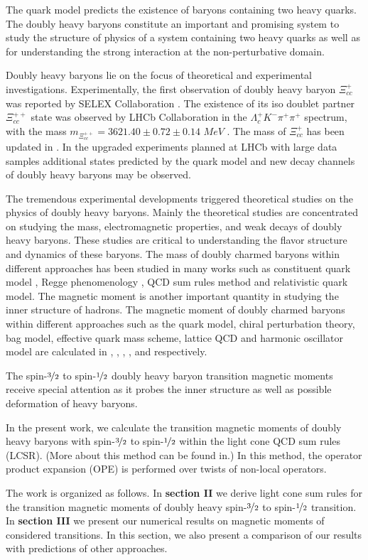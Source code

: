 \label{chp:intro}

The quark model predicts the existence of baryons containing two heavy quarks. The doubly heavy baryons constitute an important and promising system to study the structure of physics of a system containing two heavy quarks as well as for understanding the strong interaction at the non-perturbative domain.

Doubly heavy baryons lie on the focus of theoretical and experimental investigations. Experimentally, the first observation of doubly heavy baryon $\Xi_{cc}^+$ was reported by SELEX Collaboration \cite{xi+}.
The existence of its iso doublet partner $\Xi_{cc}^{++}$ state was observed by LHCb Collaboration in the $\Lambda_c^+K^-\pi^+\pi^+$ spectrum, with the mass $m_{\Xi_{cc}^{++}}=3621.40\pm0.72\pm0.14$ $MeV$ \cite{xi++}. The mass of $\Xi_{cc}^+$ has been updated in \cite{xi++,aaij2,aaij3,aaij4}. In the upgraded experiments planned at LHCb with large data samples additional states predicted by the quark model and new decay channels of doubly heavy baryons may be observed.

The tremendous experimental developments triggered theoretical studies on the physics of doubly heavy baryons. Mainly the theoretical studies are concentrated on studying the mass, electromagnetic properties, and weak decays of doubly heavy baryons. These studies are critical to understanding the flavor structure and dynamics of these baryons. The mass of doubly charmed baryons within different approaches has been studied in many works such as constituent quark model \cite{consQM1,consQM2,consQM3,consQM4,consQM5,consQM6,consQM8,consQM9}, Regge phenomenology \cite{regge1,regge2}, QCD sum rules method \cite{qcdsr1,qcdsr2,qcdsr3,qcdsr4,AlievOctet,AlievDecuplet} and relativistic quark model\cite{rqm1}. The magnetic moment is another important quantity in studying the inner structure of hadrons. The magnetic moment of doubly charmed baryons within different approaches such as the  quark model, chiral perturbation theory, bag model, effective quark mass scheme, lattice QCD and harmonic oscillator model are calculated in \cite{transition15}, \cite{transition10}, \cite{DhirEMS}, \cite{exBag}, \cite{lattice} and \cite{harmonic} respectively.

The spin-$\nicefrac{3}{2}$ to spin-$\nicefrac{1}{2}$ doubly heavy baryon transition magnetic moments receive special attention as it probes the inner structure as well as possible deformation of heavy baryons.

In the present work, we calculate the transition magnetic moments of doubly heavy baryons with spin-$\nicefrac{3}{2}$ to spin-$\nicefrac{1}{2}$ within the light cone QCD sum rules (LCSR). (More about this method can be found in\cite{lcsr1,lcsr2}.) In this method, the operator product expansion (OPE) is performed over twists of non-local operators.

The work is organized as follows. In \textbf{section II} we derive light cone sum rules for the transition magnetic moments of doubly heavy spin-$\nicefrac{3}{2}$ to spin-$\nicefrac{1}{2}$ transition. In \textbf{section III} we present our numerical results on magnetic moments of considered transitions. In this section, we also present a comparison of our results with predictions of other approaches.